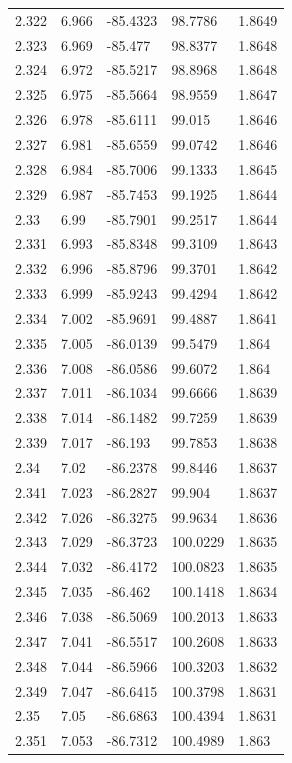 \begin{tabular}{lllll}
2.322 & 6.966 & -85.4323 & 98.7786 & 1.8649 \\
2.323 & 6.969 & -85.477 & 98.8377 & 1.8648 \\
2.324 & 6.972 & -85.5217 & 98.8968 & 1.8648 \\
2.325 & 6.975 & -85.5664 & 98.9559 & 1.8647 \\
2.326 & 6.978 & -85.6111 & 99.015 & 1.8646 \\
2.327 & 6.981 & -85.6559 & 99.0742 & 1.8646 \\
2.328 & 6.984 & -85.7006 & 99.1333 & 1.8645 \\
2.329 & 6.987 & -85.7453 & 99.1925 & 1.8644 \\
2.33 & 6.99 & -85.7901 & 99.2517 & 1.8644 \\
2.331 & 6.993 & -85.8348 & 99.3109 & 1.8643 \\
2.332 & 6.996 & -85.8796 & 99.3701 & 1.8642 \\
2.333 & 6.999 & -85.9243 & 99.4294 & 1.8642 \\
2.334 & 7.002 & -85.9691 & 99.4887 & 1.8641 \\
2.335 & 7.005 & -86.0139 & 99.5479 & 1.864 \\
2.336 & 7.008 & -86.0586 & 99.6072 & 1.864 \\
2.337 & 7.011 & -86.1034 & 99.6666 & 1.8639 \\
2.338 & 7.014 & -86.1482 & 99.7259 & 1.8639 \\
2.339 & 7.017 & -86.193 & 99.7853 & 1.8638 \\
2.34 & 7.02 & -86.2378 & 99.8446 & 1.8637 \\
2.341 & 7.023 & -86.2827 & 99.904 & 1.8637 \\
2.342 & 7.026 & -86.3275 & 99.9634 & 1.8636 \\
2.343 & 7.029 & -86.3723 & 100.0229 & 1.8635 \\
2.344 & 7.032 & -86.4172 & 100.0823 & 1.8635 \\
2.345 & 7.035 & -86.462 & 100.1418 & 1.8634 \\
2.346 & 7.038 & -86.5069 & 100.2013 & 1.8633 \\
2.347 & 7.041 & -86.5517 & 100.2608 & 1.8633 \\
2.348 & 7.044 & -86.5966 & 100.3203 & 1.8632 \\
2.349 & 7.047 & -86.6415 & 100.3798 & 1.8631 \\
2.35 & 7.05 & -86.6863 & 100.4394 & 1.8631 \\
2.351 & 7.053 & -86.7312 & 100.4989 & 1.863 \\

\end{tabular}
